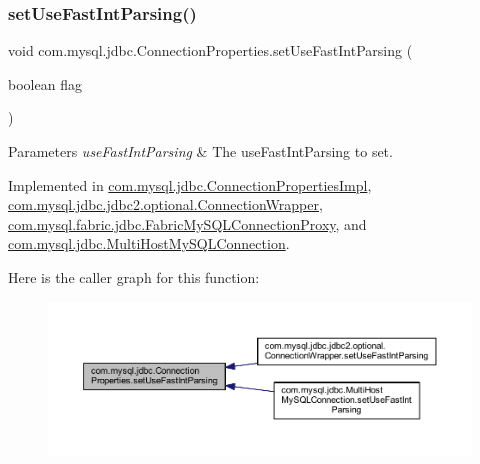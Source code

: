 \subsubsection{\texorpdfstring{set\+Use\+Fast\+Int\+Parsing()}{setUseFastIntParsing()}}
{\footnotesize\ttfamily void com.\+mysql.\+jdbc.\+Connection\+Properties.\+set\+Use\+Fast\+Int\+Parsing (\begin{DoxyParamCaption}\item[{boolean}]{flag }\end{DoxyParamCaption})}


\begin{DoxyParams}{Parameters}
{\em use\+Fast\+Int\+Parsing} & The use\+Fast\+Int\+Parsing to set. \\
\hline
\end{DoxyParams}


Implemented in \mbox{\hyperlink{classcom_1_1mysql_1_1jdbc_1_1_connection_properties_impl_ae1ca2a8981c38d1a0a31a25507299f1f}{com.\+mysql.\+jdbc.\+Connection\+Properties\+Impl}}, \mbox{\hyperlink{classcom_1_1mysql_1_1jdbc_1_1jdbc2_1_1optional_1_1_connection_wrapper_af424c555856eefbd0cad9ad2ffa0bf46}{com.\+mysql.\+jdbc.\+jdbc2.\+optional.\+Connection\+Wrapper}}, \mbox{\hyperlink{classcom_1_1mysql_1_1fabric_1_1jdbc_1_1_fabric_my_s_q_l_connection_proxy_ae195b23eae643a8e4f33efdcf46fb864}{com.\+mysql.\+fabric.\+jdbc.\+Fabric\+My\+S\+Q\+L\+Connection\+Proxy}}, and \mbox{\hyperlink{classcom_1_1mysql_1_1jdbc_1_1_multi_host_my_s_q_l_connection_a98e6251a2f619959c059daff4a1411a7}{com.\+mysql.\+jdbc.\+Multi\+Host\+My\+S\+Q\+L\+Connection}}.

Here is the caller graph for this function\+:\nopagebreak
\begin{figure}[H]
\begin{center}
\leavevmode
\includegraphics[width=350pt]{interfacecom_1_1mysql_1_1jdbc_1_1_connection_properties_a64d13f1fe9290e34ad189fd0eb13b81d_icgraph}
\end{center}
\end{figure}
\mbox{\label{interfacecom_1_1mysql_1_1jdbc_1_1_connection_properties_aefb08a45df4754d8d6c96b06d36991b5}} 
